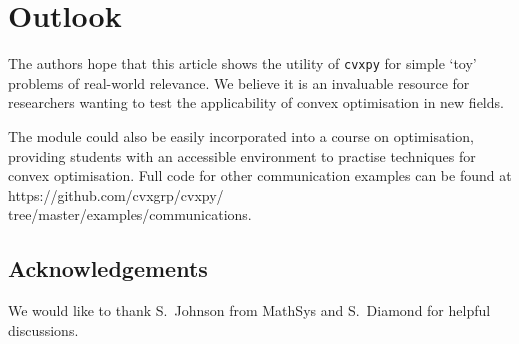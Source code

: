 \documentclass[twocolumn,secnumarabic,amssymb, nobibnotes, aps, prl,superscriptaddress]{revtex4-1}
\begin{document}
\section{Outlook}
\noindent The authors hope that this article shows the utility of \texttt{cvxpy} for simple `toy' problems of real-world relevance. We believe it is an invaluable resource for researchers wanting to test the applicability of convex optimisation in new fields. 

The module could also be easily incorporated into a course on optimisation, providing students with an accessible environment to practise techniques for convex optimisation. Full code for other communication examples can be found at https://github.com/cvxgrp/cvxpy/\\tree/master/examples/communications.



\subsection*{Acknowledgements}
We would like to thank S.~Johnson from MathSys and S.~Diamond for helpful discussions. 
\end{document}
